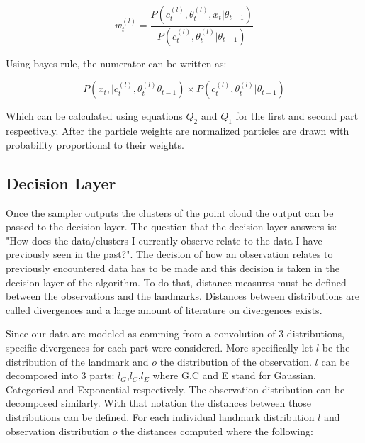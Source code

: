 \documentclass[twoside,hidelinks]{article}
\begin{document}
\begin{equation}
w_t^{(l)} = \frac {P(c_t^{(l)} , \theta_t^{(l)}, x_t| 	\theta_{t-1} )}{P(c_t^{(l)} , \theta_t^{(l)}| 	\theta_{t-1} )}
\end{equation}

Using bayes rule, the numerator can be written as:

\begin{equation}
	P(x_t , | c_t^{(l)} , \theta_t^{(l)} \theta_{t-1} ) \times P(c_t^{(l)} , \theta_t^{(l)}|  \theta_{t-1} )
\end{equation}

Which can be calculated using equations $Q_2$ and $Q_1$ for the first and second part respectively. After the particle weights are normalized particles are drawn with probability proportional to their weights.

\subsection{Decision Layer}

Once the sampler outputs the clusters of the point cloud the output can be passed to the decision layer. The question that the decision layer answers is: "How does the data/clusters I currently observe relate to the data I have previously seen in the past?". The decision of how an observation relates to previously encountered data has to be made and this decision is taken in the decision layer of the algorithm. To do that, distance measures must be defined between the observations and the landmarks. Distances between distributions are called divergences and a large amount of literature on divergences exists.

Since our data are modeled as comming from a convolution of 3 distributions, specific divergences for each part were considered. More specifically let $l$ be the distribution of the landmark and $o$ the distribution of the observation. $l$ can be decomposed into 3 parts: $l_G$,$l_C$,$l_E$ where G,C and E stand for Gaussian, Categorical and Exponential respectively. The observation distribution can be decomposed similarly. With that notation the distances between those distributions can be defined. For each individual landmark distribution $l$ and observation distribution $o$ the distances computed where the following:
\end{document}
